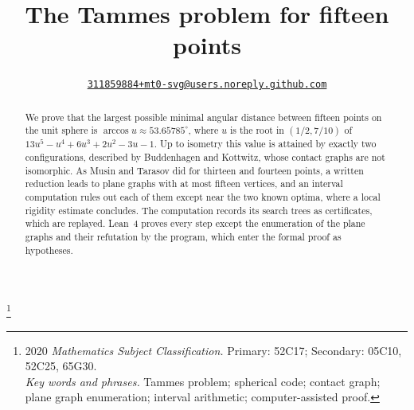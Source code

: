 \documentclass[12pt]{amsart}
\makeatletter
\newcommand{\repo}{https://github.com/mt0-svg/tammes-15}
\DeclareRobustCommand{\authorlink}{\href{\repo/issues/new/choose}{\nolinkurl{311859884+mt0-svg@users.noreply.github.com}}}
\theoremstyle{definition}
\theoremstyle{plain}
\theoremstyle{definition}
\makeatother
\begin{document}
\title[The Tammes problem for fifteen points]{The Tammes problem for fifteen points}
\author{\authorlink}
\thanks{2020 {\em Mathematics Subject Classification.} Primary: 52C17; Secondary: 05C10, 52C25, 65G30.\\\indent
{\em Key words and phrases.} Tammes problem; spherical code; contact graph; plane graph enumeration; interval arithmetic; computer-assisted proof.}

\begin{abstract}
We prove that the largest possible minimal angular distance between fifteen points on the unit sphere is $\arccos u\approx 53.65785^\circ$, where $u$ is the root in $(1/2,7/10)$ of $13u^5-u^4+6u^3+2u^2-3u-1$. Up to isometry this value is attained by exactly two configurations, described by Buddenhagen and Kottwitz, whose contact graphs are not isomorphic. As Musin and Tarasov did for thirteen and fourteen points, a written reduction leads to plane graphs with at most fifteen vertices, and an interval computation rules out each of them except near the two known optima, where a local rigidity estimate concludes. The computation records its search trees as certificates, which are replayed. Lean~4 proves every step except the enumeration of the plane graphs and their refutation by the program, which enter the formal proof as hypotheses.
\end{abstract}

\maketitle
\end{document}
